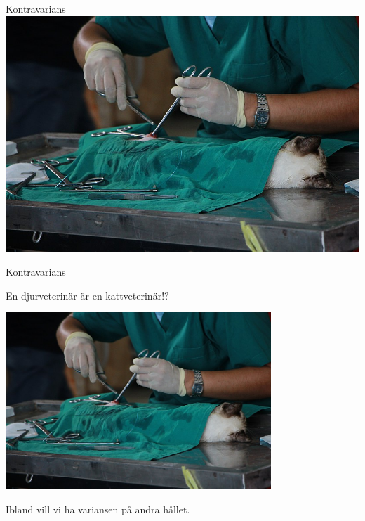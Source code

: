 \ifkompendium\else
\begin{SlideSimple}{Kontravarians}
\hspace*{-1cm}\includegraphics[width=1.2\textwidth]{../img/cat-vet.jpg}  
\end{SlideSimple}
\fi 

\begin{Slide}{Kontravarians}
\begin{center}
En djurveterinär är en kattveterinär!?

\includegraphics[width=0.75\textwidth]{../img/cat-vet.jpg}  

Ibland vill vi ha variansen på andra hållet.
\end{center}
\end{Slide}

